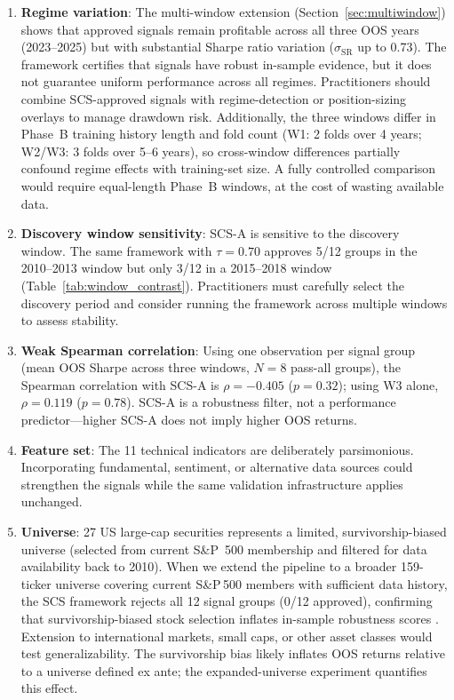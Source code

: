 \documentclass[12pt,a4paper]{article}
\begin{document}
\begin{enumerate}
  \item \textbf{Regime variation}: The multi-window extension (Section~\ref{sec:multiwindow}) shows that approved signals remain profitable across all three OOS years (2023--2025) but with substantial Sharpe ratio variation ($\sigma_{\text{SR}}$ up to 0.73). The framework certifies that signals have robust in-sample evidence, but it does not guarantee uniform performance across all regimes. Practitioners should combine SCS-approved signals with regime-detection or position-sizing overlays to manage drawdown risk. Additionally, the three windows differ in Phase~B training history length and fold count (W1: 2 folds over 4 years; W2/W3: 3 folds over 5--6 years), so cross-window differences partially confound regime effects with training-set size. A fully controlled comparison would require equal-length Phase~B windows, at the cost of wasting available data.
  \item \textbf{Discovery window sensitivity}: SCS-A is sensitive to the discovery window. The same framework with $\tau=0.70$ approves 5/12 groups in the 2010--2013 window but only 3/12 in a 2015--2018 window (Table~\ref{tab:window_contrast}). Practitioners must carefully select the discovery period and consider running the framework across multiple windows to assess stability.
  \item \textbf{Weak Spearman correlation}: Using one observation per signal group (mean OOS Sharpe across three windows, $N=8$ pass-all groups), the Spearman correlation with SCS-A is $\rho=-0.405$ ($p=0.32$); using W3 alone, $\rho=0.119$ ($p=0.78$). SCS-A is a robustness filter, not a performance predictor---higher SCS-A does not imply higher OOS returns.
  \item \textbf{Feature set}: The 11 technical indicators are deliberately parsimonious. Incorporating fundamental, sentiment, or alternative data sources could strengthen the signals while the same validation infrastructure applies unchanged.
  \item \textbf{Universe}: 27 US large-cap securities represents a limited, survivorship-biased universe (selected from current S\&P~500 membership and filtered for data availability back to 2010). When we extend the pipeline to a broader 159-ticker universe covering current S\&P\,500 members with sufficient data history, the SCS framework rejects all 12 signal groups (0/12 approved), confirming that survivorship-biased stock selection inflates in-sample robustness scores \citep{elton1996survivorship}. Extension to international markets, small caps, or other asset classes would test generalizability. The survivorship bias likely inflates OOS returns relative to a universe defined ex ante; the expanded-universe experiment quantifies this effect.

\end{enumerate}
\end{document}
